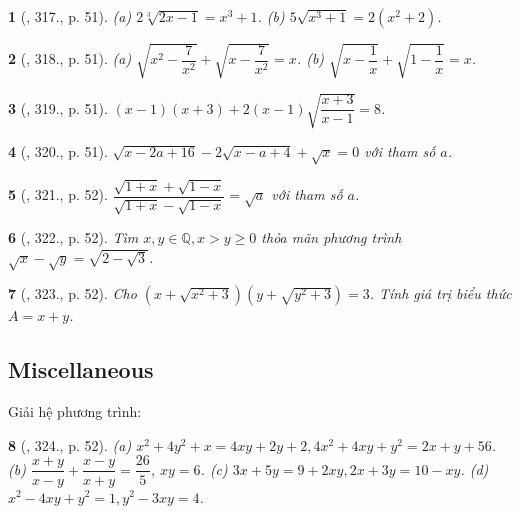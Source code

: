 \documentclass{article}
\newtheorem{baitoan}{}
\begin{document}
\begin{baitoan}[\cite{Binh_Toan_9_tap_2}, 317., p. 51]
	(a) $2\sqrt[3]{2x - 1} = x^3 + 1$. (b) $5\sqrt{x^3 + 1} = 2(x^2 + 2)$.
\end{baitoan}

\begin{baitoan}[\cite{Binh_Toan_9_tap_2}, 318., p. 51]
	(a) $\sqrt{x^2 - \dfrac{7}{x^2}} + \sqrt{x - \dfrac{7}{x^2}} = x$. (b) $\sqrt{x - \dfrac{1}{x}} + \sqrt{1 - \dfrac{1}{x}} = x$.
\end{baitoan}

\begin{baitoan}[\cite{Binh_Toan_9_tap_2}, 319., p. 51]
	$(x - 1)(x + 3) + 2(x - 1)\sqrt{\dfrac{x + 3}{x - 1}} = 8$.
\end{baitoan}

\begin{baitoan}[\cite{Binh_Toan_9_tap_2}, 320., p. 51]
	$\sqrt{x - 2a + 16} - 2\sqrt{x - a + 4} + \sqrt{x} = 0$ với tham số $a$.
\end{baitoan}

\begin{baitoan}[\cite{Binh_Toan_9_tap_2}, 321., p. 52]
	$\dfrac{\sqrt{1 + x} + \sqrt{1 - x}}{\sqrt{1 + x} - \sqrt{1 - x}} = \sqrt{a}$ với tham số $a$.
\end{baitoan}

\begin{baitoan}[\cite{Binh_Toan_9_tap_2}, 322., p. 52]
	Tìm $x,y\in\mathbb{Q},x > y\ge0$ thỏa mãn phương trình $\sqrt{x} - \sqrt{y} = \sqrt{2 - \sqrt{3}}$.
\end{baitoan}

\begin{baitoan}[\cite{Binh_Toan_9_tap_2}, 323., p. 52]
	Cho $\left(x + \sqrt{x^2 + 3}\right)\left(y + \sqrt{y^2 + 3}\right) = 3$. Tính giá trị biểu thức $A = x + y$.
\end{baitoan}

\subsection{Miscellaneous}
Giải hệ phương trình:

\begin{baitoan}[\cite{Binh_Toan_9_tap_2}, 324., p. 52]
	(a) $x^2 + 4y^2 + x = 4xy + 2y + 2,4x^2 + 4xy + y^2 = 2x + y + 56$. (b) $\dfrac{x + y}{x - y} + \dfrac{x - y}{x + y} = \dfrac{26}{5}$, $xy = 6$. (c) $3x + 5y = 9 + 2xy,2x + 3y = 10 - xy$. (d) $x^2 - 4xy + y^2 = 1,y^2 - 3xy = 4$.
\end{baitoan}
\end{document}
